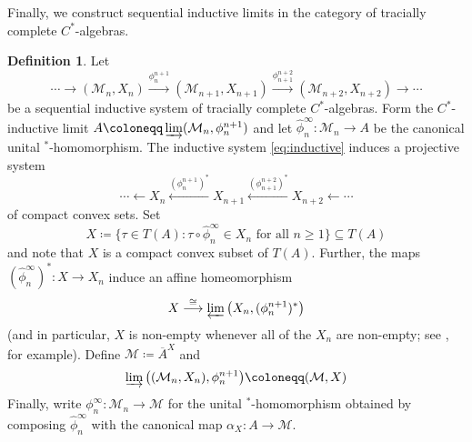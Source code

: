 \documentclass[a4paper,11pt]{amsart}
\theoremstyle{definition}
\newtheorem{definition}[theorem]{Definition}
\numberwithin{equation}{section}
\numberwithin{theorem}{section}
\newcommand{\M}{\mathcal{M}}
\newcommand{\completion}[2]{\overline{#1}^{#2}}
\begin{document}
Finally, we construct sequential inductive limits in the category of tracially complete $C^*$-algebras.

\begin{definition}\label{UTC:Limit}
	Let 
	\begin{equation}\label{eq:inductive}
		\cdots \rightarrow (\M_n,X_n) \xrightarrow{\phi_n^{n+1}} (\M_{n+1},X_{n+1}) \xrightarrow{\phi_{n+1}^{n+2}} (\M_{n+2}, X_{n+2}) \rightarrow \cdots
	\end{equation}
	be a sequential inductive system of tracially complete $C^*$-algebras.
	Form the $C^*$-inductive limit $A \coloneqq \varinjlim (\M_n,\phi_n^{n+1})$ and let $\hat\phi_n^\infty\colon\M_n \rightarrow A$ be the canonical unital $^*$-homomorphism. The inductive system \eqref{eq:inductive} induces a projective system
\begin{equation}
	\cdots \longleftarrow X_n \xleftarrow{(\phi_n^{n+1})^*} X_{n+1} \xleftarrow{(\phi_{n+1}^{n+2})^*} X_{n+2} \longleftarrow \cdots 
\end{equation}
of compact convex sets.  Set
	\begin{equation}\label{eq:ind-lim-traces}
		X \coloneqq \{ \tau \in T(A) : \tau \circ \hat\phi_n^\infty \in X_n \text{ for all } n \geq 1 \} \subseteq T(A)
	\end{equation}
	and note that $X$ is a compact convex subset of $T(A)$.  Further, the maps $(\hat\phi_n^\infty)^* \colon X \rightarrow X_n$ induce an affine homeomorphism
\begin{equation}\label{eq:proj-lim-traces}
	 X\stackrel{\cong}{\longrightarrow}\varprojlim \big(X_n, (\phi_n^{n+1})^*\big)
\end{equation}
(and in particular, $X$ is non-empty whenever all of the $X_n$ are non-empty; see \cite[Theorem~VIII.3.5]{ES52}, for example). Define $\M\coloneqq\completion{A}{X}$ and
	\begin{equation} \varinjlim \big((\M_n,X_n),\phi_n^{n+1}\big) \coloneqq (\M,X)\end{equation}
	Finally, write $\phi_n^\infty \colon \M_n \rightarrow \M$ for the unital $^*$-homomorphism obtained by composing $\hat\phi_n^\infty$ with the canonical map $\alpha_X \colon A \to \M$.  
\end{definition}
\end{document}

